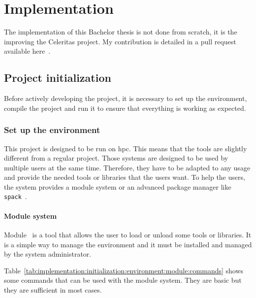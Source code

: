\chapter{Implementation}
\label{ch:implementation}

The implementation of this Bachelor thesis is not done from scratch, it is the
improving the Celeritas project.
My contribution is detailed in a pull request available here~\cite{pull-request-barras}.


\section{Project initialization}
\label{ch:implementation:initialization}

Before actively developing the project, it is necessary to set up the
environment, compile the project and run it to ensure that everything is
working as expected.

\subsection{Set up the environment}
\label{ch:implementation:initialization:environment}

This project is designed to be run on \acrshort{hpc}.
This means that the tools are slightly different from a regular project.
Those systems are designed to be used by multiple users at the same time.
Therefore, they have to be adapted to any usage and provide the needed tools
or libraries that the users want.
To help the users, the system provides a module system or an advanced package
manager like \texttt{spack}~\cite{Spack}.


\subsubsection{Module system}
\label{ch:implementation:initialization:environment:module}

Module~\cite{Module} is a tool that allows the user to load or unload some tools
or libraries.
It is a simple way to manage the environment and it must be installed and
managed by the system administrator.

Table~\ref{tab:implementation:initialization:environment:module:commands} shows
some commands that can be used with the module system.
They are basic but they are sufficient in most cases.

